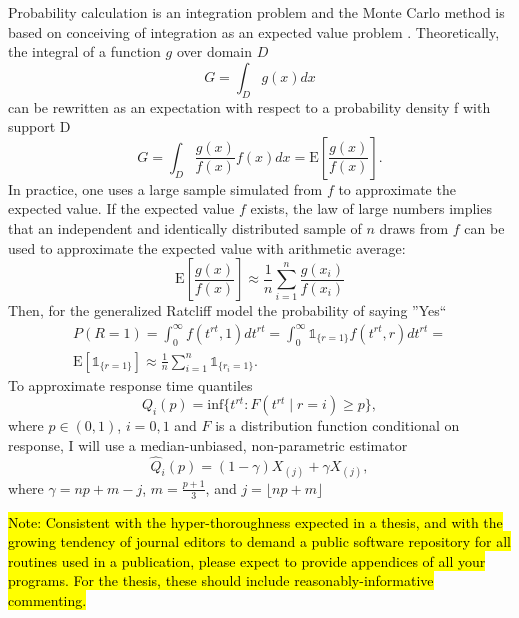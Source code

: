 \documentclass[12pt]{article}
\newcommand{\trish}[1]{\textrm{\hl{#1}}}
\begin{document}
Probability calculation is an integration problem and the Monte Carlo method is based on conceiving of integration as an expected value problem \citep{GivHoe2012, RobCas2004}. Theoretically, the integral of a function $g$ over domain $D$
%
\begin{equation*}
G = \int_D g(x)dx
\end{equation*}
%
can be rewritten as an expectation with respect to a probability density f with support D
%
\begin{equation}
G = \int_D \frac{g(x)}{f(x)}f(x)dx = \mathrm{E}\left[\frac{g(x)}{f(x)}\right].
\end{equation}
%
In practice, one uses a large sample
simulated from $f$ to approximate the expected value. If the expected value $f$ exists, the law of
large numbers implies that an independent and identically distributed sample of $n$ draws from $f$ can be used to approximate the expected value with arithmetic average:
\begin{equation}
\label{eqn:mcavg}
\mathrm{E}\left[\frac{g(x)}{f(x)}\right] \approx \frac{1}{n} \sum_{i=1}^n{\frac{g(x_i)}{f(x_i)}}
\end{equation}
Then, for the generalized Ratcliff model the probability of saying ''Yes``
\begin{eqnarray}
P(R = 1) = \int_0^\infty f(t^{rt}, 1)dt^{rt} = \int_0^\infty \mathds{1}_{\{r = 1\}}f(t^{rt}, r)dt^{rt} = \nonumber \\
\mathrm{E}\left[\mathds{1}_{\{r = 1\}}\right] \approx \frac{1}{n} \sum_{i=1}^n{\mathds{1}_{\{r_i = 1\}}}.
\end{eqnarray}
To approximate response time quantiles 
\begin{equation}
Q_i(p) = \mathrm{inf}\{t^{rt}: F(t^{rt} \mid r = i) \geq p\},
\end{equation}
where $p \in (0, 1)$, $i = 0, 1$ and $F$ is a distribution function conditional on response, I will use a median-unbiased, non-parametric estimator
\begin{equation}
\hat{Q}_i(p) = (1 - \gamma) X_{(j)} + \gamma X_{(j)},
\end{equation}
where $\gamma = np + m - j$, 
$m = \frac{p + 1}{3}$, and 
$j = \lfloor np + m \rfloor$ \citep{HynFan2007}

\trish{Note: Consistent with the hyper-thoroughness expected in a
thesis, and with the growing tendency of journal editors to demand a
public software repository for all routines used in a publication,
please expect to provide appendices of all your programs.  For the
thesis, these should include reasonably-informative commenting.}
\end{document}
